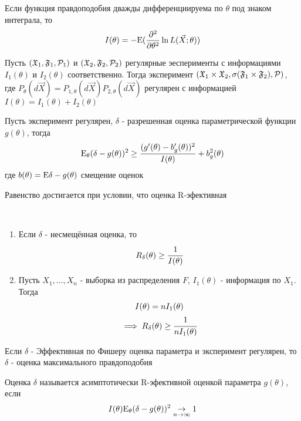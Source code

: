 \documentclass[main.tex]{subfiles}
\begin{document}
Если функция правдоподобия дважды дифференциируема по $\theta$ под знаком интеграла, то $$I(\theta)=-\mathrm{E}(\frac{\partial^2}{\partial\theta^2}\ln L(\vec{X};\theta))$$

\begin{suggestion}
	Пусть $(\mathfrak{X}_1,\mathfrak{F}_1,\mathcal{P}_1)$ и $(\mathfrak{X}_2,\mathfrak{F}_2,\mathcal{P}_2)$ регулярные эесперименты с информациями $I_1(\theta)$ и $I_2(\theta)$ соответственно. Тогда эксперимент $(\mathfrak{X}_1\times\mathfrak{X}_2,\sigma(\mathfrak{F}_1\times\mathfrak{F}_2),\mathcal{P})$, где $P_\theta(d\vec{X})=P_{1,\theta}(d\vec{X})P_{2,\theta}(d\vec{X})$ регулярен с информацией $I(\theta)=I_1(\theta)+I_2(\theta)$
\end{suggestion}

\begin{theorem}
	Пусть эксперимент регулярен, $\delta$ - разрешенная оценка параметрической функции $g(\theta)$, тогда
	$$\mathrm{E}_\theta(\delta-g(\theta))^2\geq \frac{(g'(\theta)-b'_g(\theta))^2}{I(\theta)} + b_g^2(\theta)$$
	где $b(\theta)=\mathrm{E}\delta - g(\theta)$ смещение оценок
\end{theorem}

Равенство достигается при условии, что оценка R-эфективная


\begin{suggestion} ~\\
	\begin{enumerate}
		\item Если $\delta$ - несмещённая оценка, то
		\[R_\delta(\theta)\geq\cfrac{1}{I(\theta)}\]
		\item Пусть $X_1,\dots,X_n$ - выборка из распределения $F$, $I_1(\theta)$ - информация по $X_1$. Тогда
		\begin{gather*}
			I(\theta) = nI_1(\theta)\\
			\implies R_\delta(\theta)\geq\cfrac{1}{nI_1(\theta)}
		\end{gather*}
	\end{enumerate}
\end{suggestion}

\begin{suggestion}
	Если $\delta$ - Эффективная по Фишеру оценка параметра и эксперимент регулярен, то $\delta$ - оценка максимального правдоподобия
\end{suggestion}

\begin{definition}
	Оценка $\delta$ называется асимптотически R-эфективной оценкой параметра $g(\theta)$, если
	$$I(\theta)\mathrm{E}_\theta(\delta-g(\theta))^2 \underset{n\rightarrow\infty}{\rightarrow}1$$
\end{definition}
\end{document}

